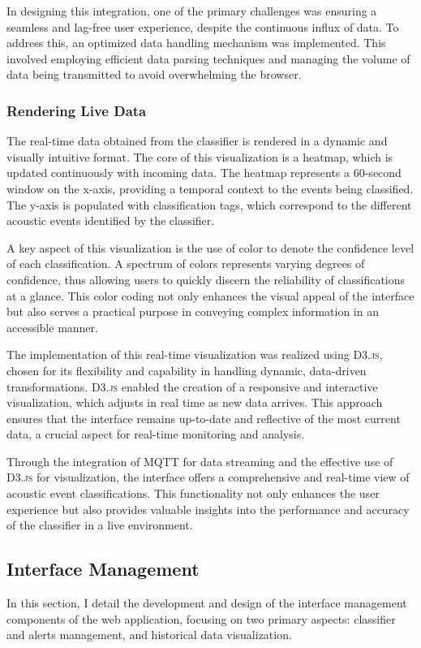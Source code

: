 In designing this integration, one of the primary challenges was ensuring a seamless and lag-free user experience, despite the continuous influx of data. To address this, an optimized data handling mechanism was implemented. This involved employing efficient data parsing techniques and managing the volume of data being transmitted to avoid overwhelming the browser.

\subsubsection{Rendering Live Data}
The real-time data obtained from the classifier is rendered in a dynamic and visually intuitive format. The core of this visualization is a heatmap, which is updated continuously with incoming data. The heatmap represents a 60-second window on the x-axis, providing a temporal context to the events being classified. The y-axis is populated with classification tags, which correspond to the different acoustic events identified by the classifier.

A key aspect of this visualization is the use of color to denote the confidence level of each classification. A spectrum of colors represents varying degrees of confidence, thus allowing users to quickly discern the reliability of classifications at a glance. This color coding not only enhances the visual appeal of the interface but also serves a practical purpose in conveying complex information in an accessible manner.

The implementation of this real-time visualization was realized using \textsc{D3.js}, chosen for its flexibility and capability in handling dynamic, data-driven transformations. \textsc{D3.js} enabled the creation of a responsive and interactive visualization, which adjusts in real time as new data arrives. This approach ensures that the interface remains up-to-date and reflective of the most current data, a crucial aspect for real-time monitoring and analysis.

Through the integration of MQTT for data streaming and the effective use of \textsc{D3.js} for visualization, the interface offers a comprehensive and real-time view of acoustic event classifications. This functionality not only enhances the user experience but also provides valuable insights into the performance and accuracy of the classifier in a live environment.

\subsection{Interface Management}
In this section, I detail the development and design of the interface management components of the web application, focusing on two primary aspects: classifier and alerts management, and historical data visualization.

